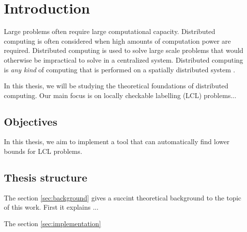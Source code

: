 
\section{Introduction}  \label{sec:introduction}

Large problems often require large computational capacity.
Distributed computing is often considered when high amounts of computation power are required.
Distributed computing is used to solve large scale problems that would otherwise be impractical to solve in a centralized system.
Distributed computing is \emph{any kind} of computing that is performed on a spatially distributed system
\cite{DBLP:books/el/leeuwen90/LamportL90}.

In this thesis, we will be studying the theoretical foundations of distributed computing.
Our main focus is on locally checkable labelling (LCL) problems...



\subsection{Objectives}
In this thesis, we aim to implement a tool that can automatically find lower bounds for LCL problems.

\subsection{Thesis structure}
The section \ref{sec:background} gives a succint theoretical background to the topic of this work.
First it explains ... %

The section \ref{sec:implementation}
